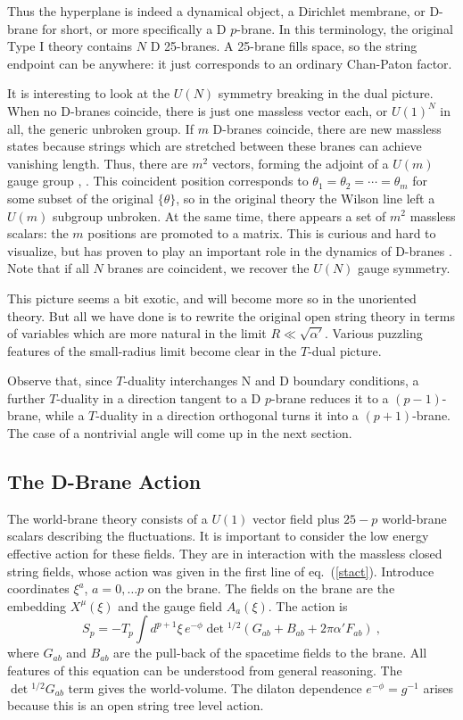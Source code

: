 \documentclass[12pt]{article}
\def\be{\begin{equation}}
\def\ee{\end{equation}}
\def\ap{\alpha'}
\begin{document}
Thus the hyperplane is indeed a dynamical object, a
Dirichlet membrane, or D-brane for short, or more specifically a D
$p$-brane.  In this terminology, the original Type I theory contains $N$
D 25-branes. A 25-brane fills space, so the string endpoint can be anywhere:
it just corresponds to an ordinary Chan-Paton factor.

It is interesting to look at the $U(N)$ symmetry breaking in the dual
picture.  When no D-branes coincide, there is just one massless vector
each, or $U(1)^N$ in all, the generic unbroken group.  If $m$
D-branes coincide, there are new massless states because
strings which are stretched between these branes
can achieve vanishing length.  Thus, there are $m^2$ vectors, forming
the adjoint of a $U(m)$ gauge group \cite{joecomb}, \cite{witbound}.
This coincident position corresponds to 
$\theta_1=\theta_2=\cdots=\theta_m$ for some subset of the original
$\{\theta\}$, so in the original theory the Wilson line left a $U(m)$
subgroup unbroken. At the same time, there
appears a set of $m^2$ massless scalars: the $m$ positions are promoted
to a matrix.  This is curious and hard to visualize, but has proven to play
an important role in the dynamics of
D-branes \cite{witbound}. Note that if all $N$
branes are coincident, we recover the $U(N)$ gauge symmetry.

This picture seems a bit exotic, and will become more so in the unoriented
theory.  But all we have done is to rewrite the original open string theory
in terms of variables which are more natural in the limit $R \ll
\sqrt{\ap}$.  Various puzzling features of the small-radius limit become
clear in the $T$-dual picture.

Observe that, since $T$-duality interchanges N and D boundary conditions, a
further $T$-duality in a direction tangent to a D $p$-brane reduces it to a
$(p-1)$-brane, while a $T$-duality in a direction orthogonal turns it into a
$(p+1)$-brane.  The case of a nontrivial angle will come up in the next
section.

\subsection{The D-Brane Action}

The world-brane
theory consists of a $U(1)$ vector field plus
$25-p$ world-brane scalars describing the fluctuations.  It is important to
consider the low energy effective action for these fields.
They are in
interaction with the massless closed string fields, whose action was given
in the first line of eq.~(\ref{stact}).
Introduce coordinates $\xi^a$, $a = 0, \ldots p$ on the brane.  The
fields on the brane are the embedding $X^\mu(\xi)$ and the gauge field
$A_a(\xi)$.  The action is\, \cite{leigh}
\be
S_p = -T_p \int d^{p+1}\xi\, e^{-\phi} \det\!^{1/2}\left(G_{ab} + B_{ab}
+ 2\pi\ap F_{ab}\right)\ , \label{dact}
\ee
where $G_{ab}$ and $B_{ab}$ are the pull-back of the spacetime fields to
the brane.  All features of this equation can be understood from general
reasoning.  The $\det\!^{1/2} G_{ab}$ term gives the world-volume. The
dilaton dependence $e^{-\phi} = g^{-1}$ arises because this is an open
string tree level action.
\end{document}

